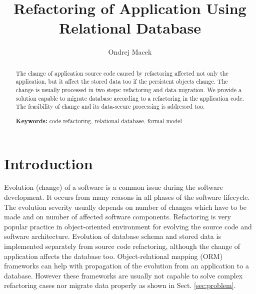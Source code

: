 \documentclass[runningheads]{comsis}
\title{Refactoring of Application Using Relational Database}
\author{Ondrej Macek\inst{1}}
\institute{Czech Technical University in Prague\\
  Karlovo namesti 13 \\
121 35 Praha 2, Czech Republic\\
  \email{macekond@fel.cvut.cz}}
\begin{document}
\maketitle

\begin{abstract}
The change of application source code caused by refactoring affected not only the application, but it affect the stored data too if the persistent objects change. The change is usually processed in two steps: refactoring and data migration. We provide a solution capable to migrate database according to a refactoring in the application code. The feasibility of change and its data-secure processing is addressed too.

\vspace{6pt}\textbf{Keywords:} code refactoring, relational database, formal model
\end{abstract}


\section{Introduction}
\label{sec:intro}
Evolution (change) of a software is a common issue during the software development. It occurs from many reasons in all phases of the software lifecycle. The evolution severity usually depends on number of changes which have to be made and on number of affected software components. Refactoring \cite{Fowler:Refactoring} is very popular practice in object-oriented environment for evolving the source code and software architecture. Evolution of database schema and stored data is implemented separately from  source code refactoring, although the change of application affects the database too. Object-relational mapping (ORM) frameworks can help with propagation of the evolution from an application to a database. However these frameworks are usually not capable to solve complex refactoring cases nor migrate data properly as shown in Sect. \ref{sec:problem}.

\end{document}
